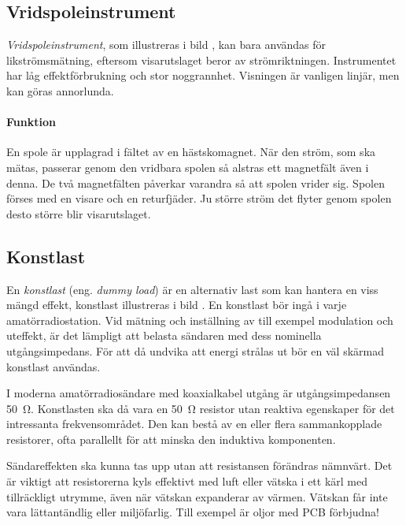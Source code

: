 \subsection{Vridspoleinstrument}


\emph{Vridspoleinstrument}, som illustreras i bild , kan
bara användas för likströmsmätning, eftersom visarutslaget beror av
strömriktningen.
Instrumentet har låg effektförbrukning och stor noggrannhet.
Visningen är vanligen linjär, men kan göras annorlunda.

\paragraph{Funktion}
En spole är upplagrad i fältet av en hästskomagnet.
När den ström, som ska mätas, passerar genom den vridbara spolen så alstras ett
magnetfält även i denna.
De två magnetfälten påverkar varandra så att spolen vrider sig.
Spolen förses med en visare och en returfjäder.
Ju större ström det flyter genom spolen desto större blir visarutslaget.


\subsection{Konstlast}
\label{konstlast}

En \emph{konstlast} (eng. \emph{dummy load}) är en alternativ last som kan
hantera en viss mängd effekt, konstlast illustreras i bild .
En konstlast bör ingå i varje amatörradiostation.
Vid mätning och inställning av till exempel modulation och uteffekt, är det
lämpligt att belasta sändaren med dess nominella utgångsimpedans.
För att då undvika att energi strålas ut bör en väl skärmad konstlast användas.

I moderna amatörradiosändare med koaxialkabel utgång är utgångsimpedansen
\qty{50}{\ohm}.
Konstlasten ska då vara en \qty{50}{\ohm} resistor utan reaktiva egenskaper för
det intressanta frekvensområdet.
Den kan bestå av en eller flera sammankopplade resistorer, ofta parallellt för
att minska den induktiva komponenten.

Sändareffekten ska kunna tas upp utan att resistansen förändras nämnvärt.
Det är viktigt att resistorerna kyls effektivt med luft eller vätska i ett kärl
med tillräckligt utrymme, även när vätskan expanderar av värmen.
Vätskan får inte vara lättantändlig eller miljöfarlig.
Till exempel är oljor med PCB förbjudna!

